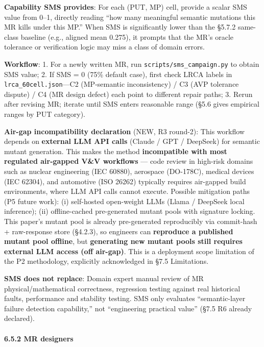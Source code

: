 \documentclass[review,12pt,authoryear]{elsarticle}
\begin{document}
\textbf{Capability SMS provides}: For each (PUT, MP) cell, provide a
scalar SMS value from 0--1, directly reading ``how many meaningful
semantic mutations this MR kills under this MP.'' When SMS is
significantly lower than the §5.7.2 same-class baseline (e.g., aligned
mean 0.275), it prompts that the MR's oracle tolerance or verification
logic may miss a class of domain errors.

\textbf{Workflow}: 1. For a newly written MR, run
\texttt{scripts/sms\_campaign.py} to obtain SMS value; 2. If SMS = 0
(75\% default case), first check LRCA labels in
\texttt{lrca\_60cell.json}---C2 (MP-semantic inconsistency) / C3 (AVP
tolerance dispute) / C4 (MR design defect) each point to different
repair paths; 3. Rerun after revising MR; iterate until SMS enters
reasonable range (§5.6 gives empirical ranges by PUT category).

\textbf{Air-gap incompatibility declaration} (NEW, R3 round-2): This
workflow depends on \textbf{external LLM API calls} (Claude / GPT /
DeepSeek) for semantic mutant generation. This makes the method
\textbf{incompatible with most regulated air-gapped V\&V workflows} ---
code review in high-risk domains such as nuclear engineering (IEC
60880), aerospace (DO-178C), medical devices (IEC 62304), and automotive
(ISO 26262) typically requires air-gapped build environments, where LLM
API calls cannot execute. Possible mitigation paths (P5 future work):
(i) self-hosted open-weight LLMs (Llama / DeepSeek local inference);
(ii) offline-cached pre-generated mutant pools with signature locking.
This paper's mutant pool is already pre-generated reproducibly via
commit-hash + raw-response store (§4.2.3), so engineers can
\textbf{reproduce a published mutant pool offline}, but
\textbf{generating new mutant pools still requires external LLM access
(off air-gap)}. This is a deployment scope limitation of the P2
methodology, explicitly acknowledged in §7.5 Limitations.

\textbf{SMS does not replace}: Domain expert manual review of MR
physical/mathematical correctness, regression testing against real
historical faults, performance and stability testing. SMS only evaluates
``semantic-layer failure detection capability,'' not ``engineering
practical value'' (§7.5 R6 already declared).

\paragraph{6.5.2 MR designers}\label{mr-designers}
\end{document}
